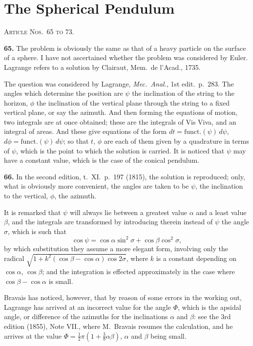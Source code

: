 \documentclass[11pt,a4paper]{article}
\theoremstyle{definition}
\begin{document}
\section*{The Spherical Pendulum}
\noindent\textsc{Article Nos.~65 to 73.}

\medskip

\textbf{65.} The problem is obviously the same as that of a heavy particle on the surface of a sphere. I have not ascertained whether the problem was considered by Euler. Lagrange refers to a solution by Clairaut, Mem.\ de l'Acad., 1735.

The question was considered by Lagrange, \textit{Mec.\ Anal.}, 1st edit.\ p.~283. The angles which determine the position are $\psi$ the inclination of the string to the horizon, $\phi$ the inclination of the vertical plane through the string to a fixed vertical plane, or say the azimuth. And then forming the equations of motion, two integrals are at once obtained; these are the integrals of Vis Viva, and an integral of areas. And these give equations of the form $dt = \text{funct.}(\psi)\,d\psi$, $d\phi = \text{funct.}(\psi)\,d\psi$; so that $t$, $\phi$ are each of them given by a quadrature in terms of $\psi$, which is the point to which the solution is carried. It is noticed that $\psi$ may have a constant value, which is the case of the conical pendulum.

\textbf{66.} In the second edition, t.~XI.~p.~197 (1815), the solution is reproduced; only, what is obviously more convenient, the angles are taken to be $\psi$, the inclination to the vertical, $\phi$, the azimuth.

It is remarked that $\psi$ will always lie between a greatest value $\alpha$ and a least value $\beta$, and the integrals are transformed by introducing therein instead of $\psi$ the angle $\sigma$, which is such that
\[
\cos\psi = \cos\alpha \sin^2\sigma + \cos\beta \cos^2\sigma,
\]
by which substitution they assume a more elegant form, involving only the radical $\sqrt{1 + k^2(\cos\beta - \cos\alpha)\cos 2\sigma}$, where $k$ is a constant depending on $\cos\alpha$, $\cos\beta$; and the integration is effected approximately in the case where $\cos\beta - \cos\alpha$ is small.

Bravais has noticed, however, that by reason of some errors in the working out, Lagrange has arrived at an incorrect value for the angle $\Phi$, which is the apsidal angle, or difference of the azimuths for the inclinations $\alpha$ and $\beta$: see the 3rd edition (1855), Note VII., where M.~Bravais resumes the calculation, and he arrives at the value $\Phi = \frac{1}{2}\pi(1 + \frac{3}{8}\alpha\beta)$, $\alpha$ and $\beta$ being small.
\end{document}
